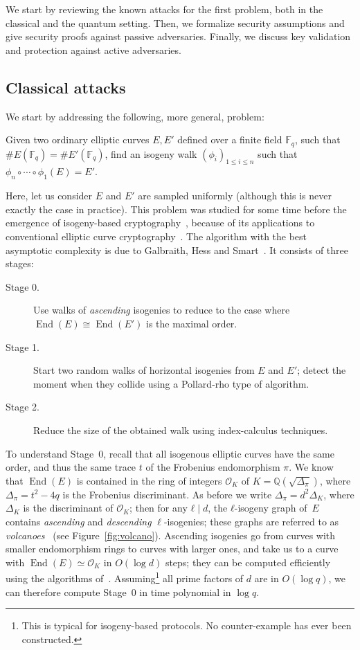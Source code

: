 \documentclass{llncs}
\newcommand{\F}{\mathbb{F}}
\renewcommand{\O}{\mathcal{O}}
\DeclareMathOperator{\End}{End}
\begin{document}
We start by reviewing the known attacks for the first problem, both in
the classical and the quantum setting. Then, we formalize security
assumptions and give security proofs against passive adversaries.
Finally, we discuss key validation and protection against active
adversaries.

\subsection{Classical attacks}
\label{sec:classical-attacks}

We start by addressing the following, more general, problem:

\begin{problem}
\label{prob:isog}
  Given two ordinary elliptic curves $E,E'$ defined over a finite
  field $\F_q$, such that $\#E(\F_q)=\#E'(\F_q)$, find an isogeny walk
  $(ϕ_i)_{1≤i≤n}$ such that $ϕ_n∘\cdots∘ϕ_1(E)=E'$.
\end{problem}

Here, let us consider $E$ and $E'$ are sampled uniformly (although this is never exactly the case in practice).
This problem was studied for some time before the emergence of
isogeny-based cryptography~\cite{Gal,GHS,galbraith+stolbunov11},
because of its applications to conventional elliptic curve
cryptography~\cite{GHS,teske06,jao+miller+venkatesan09}.  The
algorithm with the best asymptotic complexity is due to Galbraith,
Hess and Smart~\cite{GHS}. It consists of three stages:
\begin{description}
\item[Stage 0.] Use walks of \emph{ascending} isogenies to reduce to the case where
  $\End(E)\cong\End(E')$ is the maximal order.
\item[Stage 1.] Start two random walks of horizontal isogenies 
  from $E$ and $E'$; detect the
  moment when they collide using a Pollard-rho type of algorithm.
\item[Stage 2.] Reduce the size of the obtained walk using
  index-calculus techniques.
\end{description}

To understand Stage~0, recall that all isogenous elliptic curves have
the same order, and thus the same trace $t$ of the Frobenius
endomorphism $π$. 
We know that
$\End(E)$ is contained in the ring of integers $\O_K$ of
$K=ℚ(\sqrt{Δ_π})$,
where $Δ_π=t^2-4q$ is the Frobenius discriminant.
As before we write $Δ_π=d^2Δ_K$, where $Δ_K$ is the
discriminant
of $\O_K$; then for any $ℓ\mid d$, the
$ℓ$-isogeny graph of~$E$ contains \emph{ascending} and
\emph{descending} $\ell$-isogenies; 
these graphs are referred to as 
\emph{volcanoes}~\cite{fouquet+morain02} (see Figure~\ref{fig:volcano}).
Ascending isogenies go from curves with smaller endomorphism rings to
curves with larger ones, and take us to a curve with $\End(E)≃\O_K$ in
$O(\log d)$ steps; they can be computed efficiently using the
algorithms
of~\cite{kohel,fouquet+morain02,ionica+joux13,defeo2016explicit}.
Assuming\footnote{%
    This is typical for isogeny-based protocols.
    No counter-example has ever been constructed.
}
all prime factors of $d$ are in $O(\log q)$,
we can therefore compute Stage~0
in time polynomial in $\log q$.
\end{document}
